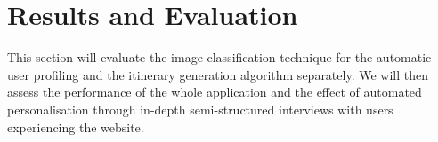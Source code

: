 
\section{Results and Evaluation}
\label{evaluation}

This section will evaluate the image
classification technique for the automatic user profiling and the itinerary
generation algorithm separately. We will then assess the performance of the
whole application and the effect of automated personalisation through in-depth
semi-structured interviews with users experiencing the website.




